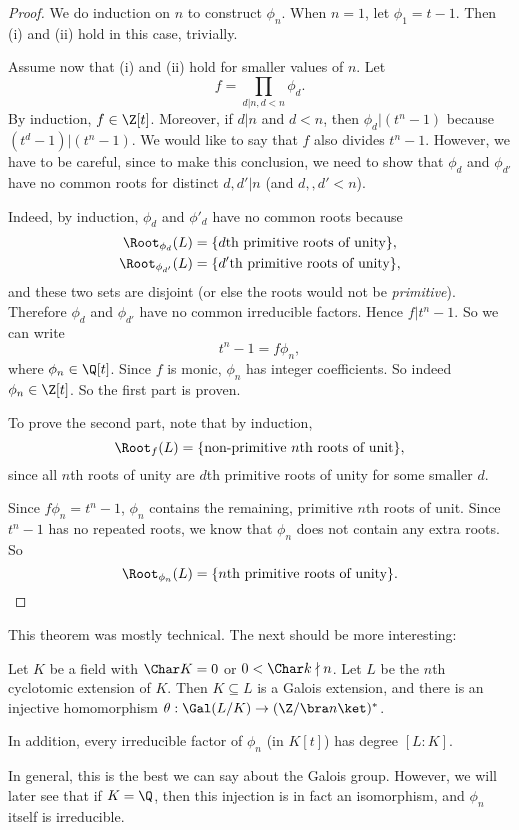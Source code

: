 \documentclass[a4paper]{article}
\begin{document}
\begin{proof}
  We do induction on $n$ to construct $\phi_n$. When $n = 1$, let $\phi_1 = t - 1$. Then (i) and (ii) hold in this case, trivially.

  Assume now that (i) and (ii) hold for smaller values of $n$. Let
  \[
    f = \prod_{d | n, d < n} \phi_d.
  \]
  By induction, $f \in \Z[t]$. Moreover, if $d | n$ and $d < n$, then $\phi_d | (t^n - 1)$ because $(t^d - 1) | (t^n - 1)$. We would like to say that $f$ also divides $t^n - 1$. However, we have to be careful, since to make this conclusion, we need to show that $\phi_d$ and $\phi_{d'}$ have no common roots for distinct $d, d' | n$ (and $d, ,d' < n$).

  Indeed, by induction, $\phi_d$ and $\phi'_d$ have no common roots because
  \begin{align*}
    \Root_{\phi_d}(L) &= \{d\text{th primitive roots of unity}\},\\
    \Root_{\phi_{d'}}(L) &= \{d'\text{th primitive roots of unity}\},
  \end{align*}
  and these two sets are disjoint (or else the roots would not be \emph{primitive}). Therefore $\phi_d$ and $\phi_{d'}$ have no common irreducible factors. Hence $f | t^n - 1$.  So we can write
  \[
    t^n - 1 = f \phi_n,
  \]
  where $\phi_n \in \Q[t]$. Since $f$ is monic, $\phi_n$ has integer coefficients. So indeed $\phi_n \in \Z[t]$. So the first part is proven.

  To prove the second part, note that by induction,
  \[
    \Root_f(L) = \{\text{non-primitive }n\text{th roots of unit}\},
  \]
  since all $n$th roots of unity are $d$th primitive roots of unity for some smaller $d$.

  Since $f \phi_n = t^n - 1$, $\phi_n$ contains the remaining, primitive $n$th roots of unit. Since $t^n - 1$ has no repeated roots, we know that $\phi_n$ does not contain any extra roots. So
  \[
    \Root_{\phi_n}(L) = \{n\text{th primitive roots of unity}\}.
  \]
\end{proof}

This theorem was mostly technical. The next should be more interesting:
\begin{thm}[]
  Let $K$ be a field with $\Char K = 0$ or $0 < \Char k \nmid n$. Let $L$ be the $n$th cyclotomic extension of $K$. Then $K\subseteq L$ is a Galois extension, and there is an injective homomorphism $\theta: \Gal(L/K) \to (\Z/\bra n\ket)^*$.

  In addition, every irreducible factor of $\phi_n$ (in $K[t]$) has degree $[L:K]$.
\end{thm}
In general, this is the best we can say about the Galois group. However, we will later see that if $K = \Q$, then this injection is in fact an isomorphism, and $\phi_n$ itself is irreducible.
\end{document}
